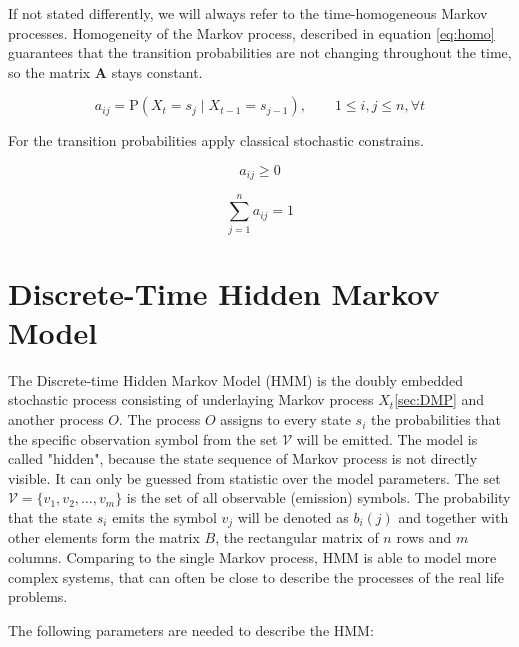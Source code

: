 \documentclass[thesis=M,english]{FITthesis}[2012/10/20]
\newcommand{\matr}[1]{\mathbf{#1}}
\begin{document}
If not stated differently, we will always refer to the time-homogeneous Markov processes. Homogeneity of the Markov process, described in equation \eqref{eq:homo} guarantees that the transition probabilities are not changing throughout the time, so the matrix $\matr{A}$ stays constant. 

\begin{equation}\label{eq:homo}
   a_{ij} = \mathrm{P}(X_t = s_j \mid X_{t-1} = s_{j-1} ),\qquad 1 \leq i,j \leq n, \forall t
\end{equation}

For the transition probabilities apply classical stochastic constrains.

\begin{equation}
   a_{ij} \geq 0
\end{equation}

\begin{equation}
   \sum_{j=1}^n a_{ij} = 1
\end{equation}

\section{Discrete-Time Hidden Markov Model}

The Discrete-time Hidden Markov Model (HMM) is the doubly embedded stochastic process consisting of underlaying Markov process $X_t$\ref{sec:DMP} and another process $O$. The process $O$ assigns to every state $s_i$ the probabilities that the specific observation symbol from the set $\mathcal{V}$ will be emitted. The model is called "hidden", because the state sequence of Markov process is not directly visible. It can only be guessed from statistic over the model parameters. The set $\mathcal{V}=\{  v_1,v_2,\dots,v_m\}$ is the set of all observable (emission) symbols. The probability that the state $s_i$ emits the symbol $v_j$ will be denoted as $b_i(j)$ and together with other elements form the matrix $B$, the rectangular matrix of $n$ rows and $m$ columns. Comparing to the single Markov process, HMM is able to model more complex systems, that can often be close to describe the processes of the real life problems.  
  
The following parameters are needed to describe the HMM:
\end{document}
